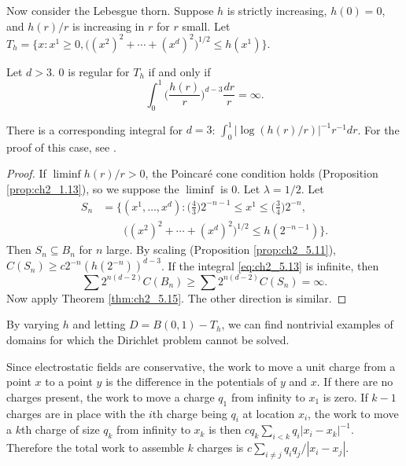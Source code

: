 
Now consider the Lebesgue thorn. Suppose $h$ is strictly increasing, $h(0) = 0$, and $h(r)/r$ is increasing in $r$ for $r$ small. Let $T_h = \{x : x^1 \geq 0,\big((x^2)^2 + \cdots + (x^d)^2\big)^{1/2} \leq h(x^1)\}$.

\begin{proposition}\label{prop:ch2_5.17}
Let $d > 3$. $0$ is regular for $T_h$ if and only if
\begin{equation}\label{eq:ch2_5.13}
    \int_0^1 \Big(\frac{h(r)}{r}\Big)^{d-3}\frac{dr}{r} = \infty.
\end{equation}
\end{proposition}

There is a corresponding integral for $d = 3$: $\int_0^1|\log(h(r)/r)|^{-1}r^{-1}dr$.
For the proof of this case, see \cite{PortStone1978}.

\begin{proof}
If $\liminf h(r)/r > 0$, the Poincar\'e cone condition holds (Proposition \ref{prop:ch2_1.13}), so we suppose the $\liminf$ is $0$. Let $\lambda = 1/2$. Let
\begin{align*}
    S_n &= \{(x^1,\ldots,x^d) : \Big(\frac{4}{3}\Big)2^{-n-1} \leq x^1 \leq \Big(\frac{3}{4}\Big)2^{-n}, \\
    &\qquad\big((x^2)^2 + \cdots + (x^d)^2\big)^{1/2} \leq h(2^{-n-1})\}.
\end{align*}
Then $S_n \subseteq B_n$ for $n$ large. By scaling (Proposition \ref{prop:ch2_5.11}), $C(S_n) \geq c2^{-n}(h(2^{-n}))^{d-3}$. If the integral \eqref{eq:ch2_5.13} is infinite, then
\[
    \sum 2^{n(d-2)}C(B_n) \geq \sum 2^{n(d-2)}C(S_n) = \infty.
\]
Now apply Theorem \ref{thm:ch2_5.15}. The other direction is similar.
\end{proof}

By varying $h$ and letting $D = B(0,1) - T_h$, we can find nontrivial examples of domains for which the Dirichlet problem cannot be solved.


Since electrostatic fields are conservative, the work to move a unit charge from a point $x$ to a point $y$ is the difference in the potentials of $y$ and $x$. If there are no charges present, the work to move a charge $q_1$ from infinity to $x_1$ is zero. If $k-1$ charges are in place with the $i$th charge being $q_i$ at location $x_i$, the work to move a $k$th charge of size $q_k$ from infinity to $x_k$ is then $cq_k\sum_{i<k}q_i|x_i-x_k|^{-1}$. Therefore the total work to assemble $k$ charges is $c\sum_{i\neq j}q_iq_j/|x_i-x_j|$.

